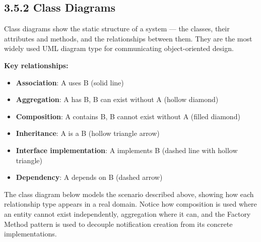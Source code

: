 \documentclass[11pt,a4paper]{book}
\begin{document}
\subsection{3.5.2 Class Diagrams}

Class diagrams show the static structure of a system --- the classes, their attributes and methods, and the relationships between them. They are the most widely used UML diagram type for communicating object-oriented design.

\textbf{Key relationships:}
\begin{itemize}
  \item \textbf{Association}: A uses B (solid line)
  \item \textbf{Aggregation}: A has B, B can exist without A (hollow diamond)
  \item \textbf{Composition}: A contains B, B cannot exist without A (filled diamond)
  \item \textbf{Inheritance}: A is a B (hollow triangle arrow)
  \item \textbf{Interface implementation}: A implements B (dashed line with hollow triangle)
  \item \textbf{Dependency}: A depends on B (dashed arrow)
\end{itemize}


The class diagram below models the scenario described above, showing how each relationship type appears in a real domain. Notice how composition is used where an entity cannot exist independently, aggregation where it can, and the Factory Method pattern is used to decouple notification creation from its concrete implementations.
\end{document}
